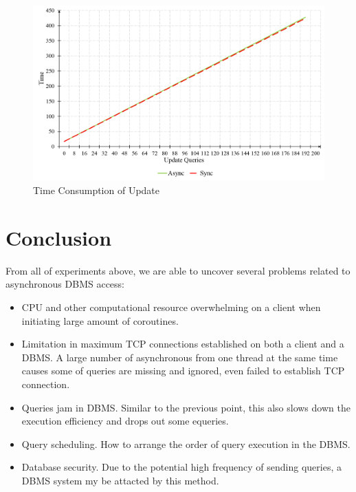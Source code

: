 \documentclass[onecolumn, conference, 12pt]{IEEEtran}
\begin{document}
	\begin{figure}[!t]
		\centering
		\includegraphics[width=6.5in]{fig/update.png}
		\caption{Time Consumption of Update}
		\label{fig_update}
	\end{figure}
	\section{Conclusion}

	From all of experiments above, we are able to uncover several problems related to asynchronous DBMS access:
	\begin{itemize}
		\item CPU and other computational resource overwhelming on a client when initiating large amount of coroutines.
		\item Limitation in maximum TCP connections established on both a client and a DBMS. A large number of asynchronous from one thread at the same time causes some of queries are missing and ignored, even failed to establish TCP connection.
		\item Queries jam in DBMS. Similar to the previous point, this also slows down the execution efficiency and drops out some equeries.
		\item Query scheduling. How to arrange the order of query execution in the DBMS.
		\item Database security. Due to the potential high frequency of sending queries, a DBMS system my be attacted by this method. 
	\end{itemize}
	
\end{document}
